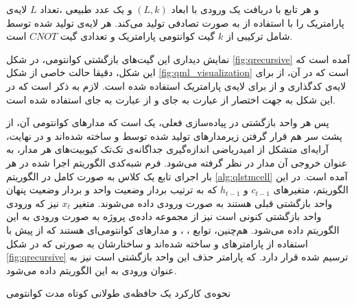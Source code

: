 و هر تابع 
با دریافت یک ورودی با ابعاد
$(L, k)$
و یک عدد طبیعی
،تعداد
$L$
لایه‌ی پارامتریک را با استفاده از
به صورت تصادفی تولید می‌کند.
هر لایه‌ی تولید شده توسط
شامل ترکیبی از 
$k$
گیت کوانتومی پارامتریک و تعدادی گیت 
$CNOT$
است.


نمایش دیداری این گیت‌های بازگشتی کوانتومی، در شکل
\ref{fig:qrecursive}
آمده است که این شکل، دقیقا حالت خاصی از شکل
\ref{fig:qml_visualization}
است که در آن، از 
برای لایه‌ی کدگذاری و از
برای لایه‌ی پارامتریک استفاده شده است.
لازم به ذکر است که در این شکل به جهت اختصار از عبارت
به جای
و از عبارت
به جای 
استفاده شده است.

پس هر واحد بازگشتی در پیاده‌سازی فعلی، یک
است که مدارهای کوانتومی آن، از پشت سر هم قرار گرفتن زیرمدارهای تولید شده توسط
و
ساخته شده‌اند و در نهایت، آرایه‌ای متشکل از امیدریاضی اندازه‌گیری جداگانه‌ی تک‌تک کیوبیت‌های هر مدار، به عنوان خروجی آن مدار در نظر گرفته می‌شود.
فرم شبه‌کدی الگوریتم اجرا شده در هر بار اجرای تابع
یک کلاس
به صورت کامل در الگوریتم
\ref{alg:qlstmcell}
آمده است. در این الگوریتم، متغیرهای
$c_{t-1}$ و
$h_{t-1}$
که به ترتیب بردار وضعیت واحد و بردار وضعیت پنهان واحد بازگشتی قبلی هستند به صورت ورودی داده می‌شوند. متغیر
$x_{t}$
نیز که ورودی واحد بازگشتی کنونی است نیز از مجموعه داده‌ی پروژه به صورت ورودی به این الگوریتم داده می‌شود. هم‌چنین، توابع
،
،
 و
مدارهای کوانتومی‌ای هستند که از پیش با استفاده از پارامترهای
و
ساخته شده‌اند و ساختارشان به صورتی که در شکل
\ref{fig:qrecursive}
ترسیم شده قرار دارد.
که پارامتر حذف این واحد بازگشتی است نیز به عنوان ورودی به این الگوریتم داده می‌شود.

\begin{algorithm}[t]
\caption{نحوه‌ی کارکرد یک حافظه‌ی طولانی کوتاه مدت کوانتومی} \label{alg:full_qlstm}
\end{algorithm}

